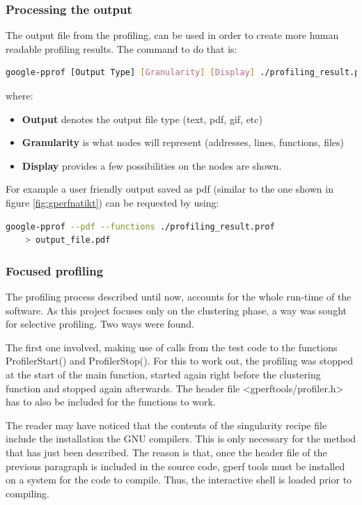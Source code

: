 \subsubsection{Processing the output}

The output file from the profiling, can be used in order to create more human readable profiling results. The command to do that is:
\begin{lstlisting}[language=bash]
google-pprof [Output Type] [Granularity] [Display] ./profiling_result.prof > output.file
\end{lstlisting}

where:
\begin{itemize}
    \item \textbf{Output} denotes the output file type (text, pdf, gif, etc)
    \item \textbf{Granularity} is what nodes will represent (addresses, lines, functions, files)
    \item \textbf{Display} provides a few possibilities on the nodes are shown.
\end{itemize}

For example a user friendly output saved as pdf (similar to the one shown in figure \ref{fig:gperfnatikt}) can be requested by using:
\begin{lstlisting}[language=bash]
google-pprof --pdf --functions ./profiling_result.prof
    > output_file.pdf
\end{lstlisting}

\subsubsection{Focused profiling}
The profiling process described until now, accounts for the whole run-time of the software. As this project focuses only on the clustering phase, a way was sought for selective profiling. Two ways were found.

The first one involved, making use of calls from the test code to the functions ProfilerStart() and  ProfilerStop(). For this to work out, the profiling was stopped at the start of the main function, started again right before the clustering function and stopped again afterwards. The header file <gperftools/profiler.h> has to also be included for the functions to work. 

The reader may have noticed that the contents of the singularity recipe file include the installation the GNU compilers. This is only necessary for the method that has just been described. The reason is that, once the header file of the previous paragraph is included in the source code, gperf tools must be installed on a system for the code to compile. Thus, the interactive shell is loaded prior to compiling.


